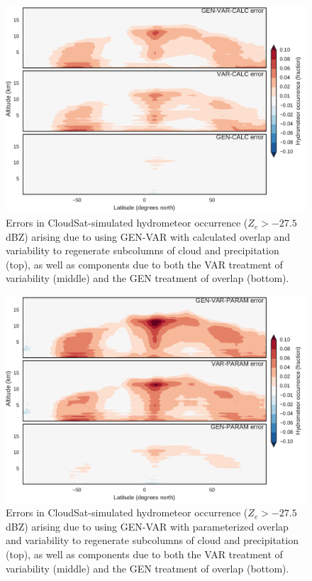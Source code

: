\begin{figure}[htbp]
\centering
\includegraphics{graphics/subgrid2_hfba_zonal_gen-var-calc_diff.pdf}
\caption{\label{fig:subgrid2_hfba_zonal_diff}Errors in
CloudSat-simulated hydrometeor occurrence (\(Z_e > -27.5\) dBZ) arising
due to using GEN-VAR with calculated overlap and variability to
regenerate subcolumns of cloud and precipitation (top), as well as
components due to both the VAR treatment of variability (middle) and the
GEN treatment of overlap
(bottom).}\label{fig:subgrid2ux5fhfbaux5fzonalux5fdiff}
\end{figure}

\begin{figure}[htbp]
\centering
\includegraphics{graphics/subgrid2_hfba_zonal_gen-var-param_diff.pdf}
\caption{\label{fig:subgrid2_hfba_zonal_gen-var-param_diff}Errors in
CloudSat-simulated hydrometeor occurrence (\(Z_e > -27.5\) dBZ) arising
due to using GEN-VAR with parameterized overlap and variability to
regenerate subcolumns of cloud and precipitation (top), as well as
components due to both the VAR treatment of variability (middle) and the
GEN treatment of overlap
(bottom).}\label{fig:subgrid2ux5fhfbaux5fzonalux5fgen-var-paramux5fdiff}
\end{figure}

